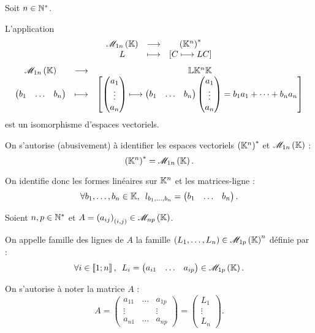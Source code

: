 \begin{abus}[Matrice-ligne \(=\) forme linéaire]
Soit \(n\in\mathbb{N}^*\).

L'application \[\fonctionlambda{\M{1n}}{\paren{\K^n}\etoile}{L}{\croch{C\mapsto LC}}\] \cad \[\fonctionlambda{\M{1n}}{\L{\K^n}{\K}}{\begin{pmatrix}
b_1 & \dots & b_n
\end{pmatrix}}{\croch{\begin{pmatrix}
a_1 \\
\vdots \\
a_n
\end{pmatrix}\mapsto\begin{pmatrix}
b_1 & \dots & b_n
\end{pmatrix}\begin{pmatrix}
a_1 \\
\vdots \\
a_n
\end{pmatrix}=b_1a_1+\dots+b_na_n}}\] est un isomorphisme d'espaces vectoriels.

On s'autorise (abusivement) à identifier les espaces vectoriels \(\left(\mathbb{K}^n\right)^{*}\) et \(\M{1n}\) : \[\paren{\K^n}\etoile=\M{1n}.\]

On identifie donc les formes linéaires sur \(\mathbb{K}^n\) et les matrices-ligne : \[\quantifs{\forall b_1,\dots,b_n\in\K}l_{b_1,\dots,b_n}=\begin{pmatrix}
b_1 & \dots & b_n
\end{pmatrix}.\]
\end{abus}

\begin{defi}
Soient \(n,p\in\mathbb{N}^*\) et \(A=\paren{a_{ij}}_{\paren{i,j}}\in\M{np}\).

On appelle famille des lignes de \(A\) la famille \(\paren{L_1,\dots,L_n}\in\M{1p}^n\) définie par : \[\quantifs{\forall i\in\interventierii{1}{n}}L_i=\begin{pmatrix}
a_{i1} & \dots & a_{ip}
\end{pmatrix}\in\M{1p}.\]

On s'autorise à noter la matrice \(A\)  : \[A=\begin{pmatrix}
a_{11} & \dots & a_{1p} \\
\vdots &  & \vdots \\
a_{n1} & \dots & a_{np}
\end{pmatrix}=\begin{pmatrix}
L_1 \\
\vdots \\
L_n
\end{pmatrix}.\]
\end{defi}

